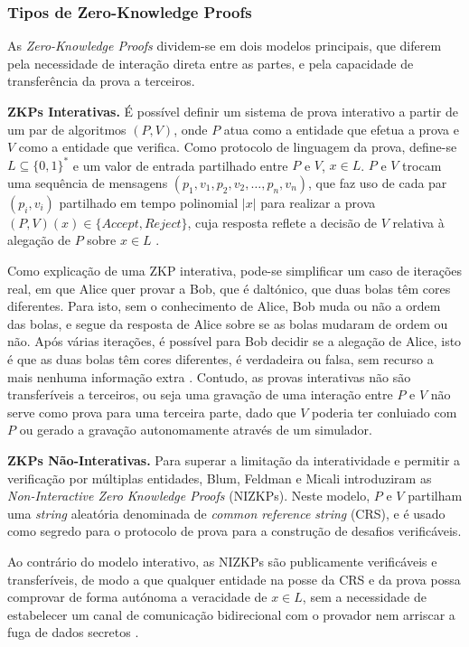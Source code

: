 \subsubsection{Tipos de Zero-Knowledge Proofs}

As \textit{Zero-Knowledge Proofs} dividem-se em dois modelos principais, que diferem pela necessidade de interação direta entre as partes, e pela capacidade de transferência da prova a terceiros.

\textbf{ZKPs Interativas.} É possível definir um sistema de prova interativo a partir de um par de algoritmos $(P, V)$, onde $P$ atua como a entidade que efetua a prova e $V$ como a entidade que verifica. Como protocolo de linguagem da prova, define-se $L \subseteq \{0,1\}^*$ e um valor de entrada partilhado entre $P$ e $V$, $x \in L$. $P$ e $V$ trocam uma sequência de mensagens $(p_1, v_1, p_2, v_2, \ldots, p_n, v_n)$, que faz uso de cada par $(p_i, v_i)$ partilhado em tempo polinomial $|x|$ para realizar a prova $(P,V)(x) \in \{Accept, Reject\}$, cuja resposta reflete a decisão de $V$ relativa à alegação de $P$ sobre $x \in L$ \cite{kurmi2015survey}.

Como explicação de uma ZKP interativa, pode-se simplificar um caso de iterações real, em que Alice quer provar a Bob, que é daltónico, que duas bolas têm cores diferentes. Para isto, sem o conhecimento de Alice, Bob muda ou não a ordem das bolas, e segue da resposta de Alice sobre se as bolas mudaram de ordem ou não. Após várias iterações, é possível para Bob decidir se a alegação de Alice, isto é que as duas bolas têm cores diferentes, é verdadeira ou falsa, sem recurso a mais nenhuma informação extra \cite{mulder2023trends}. Contudo, as provas interativas não são transferíveis a terceiros, ou seja uma gravação de uma interação entre $P$ e $V$ não serve como prova para uma terceira parte, dado que $V$ poderia ter conluiado com $P$ ou gerado a gravação autonomamente através de um simulador.

\textbf{ZKPs Não-Interativas.} Para superar a limitação da interatividade e permitir a verificação por múltiplas entidades, Blum, Feldman e Micali \cite{blum2019non} introduziram as \textit{Non-Interactive Zero Knowledge Proofs} (NIZKPs). Neste modelo, $P$ e $V$ partilham uma \textit{string} aleatória denominada de \textit{common reference string} (CRS), e é usado como segredo para o protocolo de prova para a construção de desafios verificáveis.

Ao contrário do modelo interativo, as NIZKPs são publicamente verificáveis e transferíveis, de modo a que qualquer entidade na posse da CRS e da prova possa comprovar de forma autónoma a veracidade de $x \in L$, sem a necessidade de estabelecer um canal de comunicação bidirecional com o provador nem arriscar a fuga de dados secretos \cite{mulder2023trends}.

